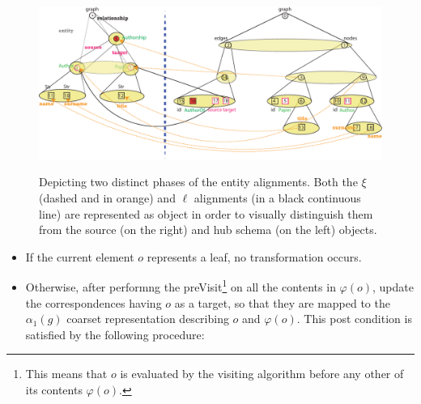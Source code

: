 \begin{example}[continues=ex:examplegraphdata,label=ex:examplereferencedOcaml]
\begin{figure}[!t]
	\begin{minipage}{\textwidth}
		\centering
		\includegraphics[width=\textwidth]{fig/04model/04bAlignment}
		\label{subfig:match2}
	\end{minipage}
	\caption{Depicting two distinct phases of the entity alignments. Both the $\xi$  (dashed and in orange) and  $\ell$ alignments (in a black continuous line) are represented as object in order to visually distinguish them from the source (on the right) and hub  schema (on the left) objects.}
	\label{fig:alignmentrefinement}
\end{figure}
\begin{itemize}
	\item If the current element $o$ represents a leaf, no transformation occurs.
	\item Otherwise, after performng the preVisit\footnote{This means that $o$ is evaluated by the visiting algorithm before any other of its contents $\varphi(o)$.} on all the contents in $\varphi(o)$, update the  correspondences having $o$ as  a target, so that they are mapped to the $\alpha_1(g)$ coarset representation describing $o$ and $\varphi(o)$. This post condition is satisfied by the following procedure:
	\medskip
	

\end{itemize}
\end{example}
